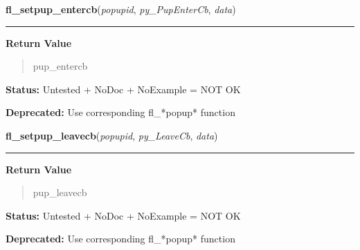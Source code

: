     \label{xformslib:library:fl_setpup_entercb}

    \vspace{0.5ex}

\hspace{.8\funcindent}\begin{boxedminipage}{\funcwidth}

    \raggedright \textbf{fl\_setpup\_entercb}(\textit{popupid}, \textit{py\_PupEnterCb}, \textit{data})

    \vspace{-1.5ex}

    \rule{\textwidth}{0.5\fboxrule}
\setlength{\parskip}{2ex}
\setlength{\parskip}{1ex}
      \textbf{Return Value}
    \vspace{-1ex}

      \begin{quote}
      pup\_entercb

      \end{quote}

\textbf{Status:} Untested + NoDoc + NoExample = NOT OK



\textbf{Deprecated:} Use corresponding fl\_*popup* function



    \end{boxedminipage}

    \label{xformslib:library:fl_setpup_leavecb}

    \vspace{0.5ex}

\hspace{.8\funcindent}\begin{boxedminipage}{\funcwidth}

    \raggedright \textbf{fl\_setpup\_leavecb}(\textit{popupid}, \textit{py\_LeaveCb}, \textit{data})

    \vspace{-1.5ex}

    \rule{\textwidth}{0.5\fboxrule}
\setlength{\parskip}{2ex}
\setlength{\parskip}{1ex}
      \textbf{Return Value}
    \vspace{-1ex}

      \begin{quote}
      pup\_leavecb

      \end{quote}

\textbf{Status:} Untested + NoDoc + NoExample = NOT OK



\textbf{Deprecated:} Use corresponding fl\_*popup* function



    \end{boxedminipage}


